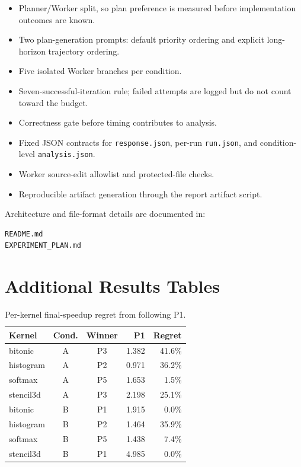 \documentclass[conference]{IEEEtran}
\begin{document}
\begin{itemize}
\item Planner/Worker split, so plan preference is measured before implementation
outcomes are known.
\item Two plan-generation prompts: default priority ordering and explicit
long-horizon trajectory ordering.
\item Five isolated Worker branches per condition.
\item Seven-successful-iteration rule; failed attempts are logged but do not
count toward the budget.
\item Correctness gate before timing contributes to analysis.
\item Fixed JSON contracts for \texttt{response.json}, per-run
\texttt{run.json}, and condition-level \texttt{analysis.json}.
\item Worker source-edit allowlist and protected-file checks.
\item Reproducible artifact generation through the report artifact script.
\end{itemize}

Architecture and file-format details are documented in:
\begin{lstlisting}
README.md
EXPERIMENT_PLAN.md
\end{lstlisting}

\section{Additional Results Tables}
\FloatBarrier

\begin{table}[H]
\centering
\caption{Per-kernel final-speedup regret from following P1.}
\scriptsize
\begin{tabular}{lccrr}
\toprule
\textbf{Kernel} & \textbf{Cond.} & \textbf{Winner} & \textbf{P1} &
\textbf{Regret} \\
\midrule
bitonic & A & P3 & 1.382 & 41.6\% \\
histogram & A & P2 & 0.971 & 36.2\% \\
softmax & A & P5 & 1.653 & 1.5\% \\
stencil3d & A & P3 & 2.198 & 25.1\% \\
bitonic & B & P1 & 1.915 & 0.0\% \\
histogram & B & P2 & 1.464 & 35.9\% \\
softmax & B & P5 & 1.438 & 7.4\% \\
stencil3d & B & P1 & 4.985 & 0.0\% \\
\bottomrule
\end{tabular}
\end{table}
\end{document}
